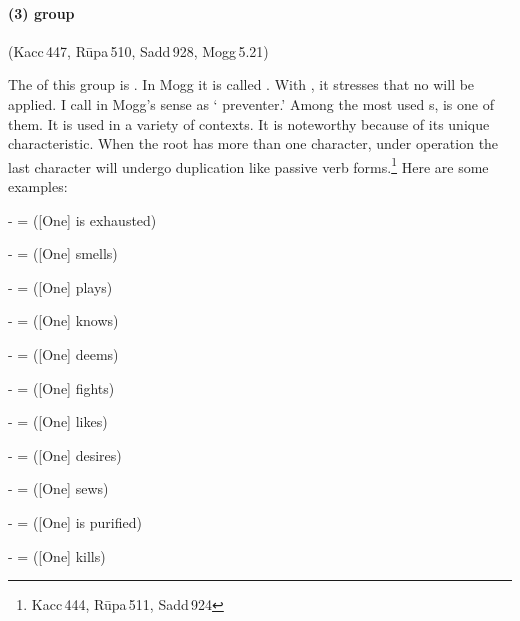 \paragraph*{(3)  group} (Kacc\,447, R\=upa\,510, Sadd\,928, Mogg\,5.21)\label{pacca:ya1}\label{pacca:yaka}\par
The  of this group is . In Mogg it is called . With , it stresses that no  will be applied. I call  in Mogg's sense as ` preventer.' Among the most used s,  is one of them. It is used in a variety of contexts. It is noteworthy because of its unique characteristic. When the root has more than one character, under  operation the last character will undergo duplication like passive verb forms.\footnote{Kacc\,444, R\=upa\,511, Sadd\,924} Here are some examples:\par
-  =  ([One] is exhausted)\par
-  =  ([One] smells)\par
-  =  ([One] plays)\par
-  =  ([One] knows)\par
-  =  ([One] deems)\par
-  =  ([One] fights)\par
-  =  ([One] likes)\par
-  =  ([One] desires)\par
-  =  ([One] sews)\par
-  =  ([One] is purified)\par
-  =  ([One] kills)\par

